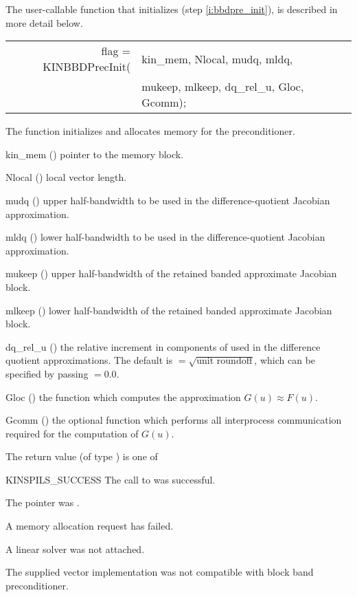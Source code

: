The user-callable function that initializes {\kinbbdpre} (step \ref{i:bbdpre_init}),
is described in more detail below.
{
   \begin{tabular}[t]{@{}r@{}l@{}}
     flag = KINBBDPrecInit(&kin\_mem, Nlocal, mudq, mldq, \\
                           &mukeep, mlkeep, dq\_rel\_u, Gloc, Gcomm);
   \end{tabular}
}
{
  The function  initializes and allocates
  memory for the {\kinbbdpre} preconditioner.
}
{
  \begin{args}[dq\_rel\_u]
  \item[kin\_mem] ()
    pointer to the {\kinsol} memory block.
  \item[Nlocal] ()
    local vector length.
  \item[mudq] ()
    upper half-bandwidth to be used in the difference-quotient Jacobian approximation.
  \item[mldq] ()
    lower half-bandwidth to be used in the difference-quotient Jacobian approximation.
  \item[mukeep] ()
    upper half-bandwidth of the retained banded approximate Jacobian block.
  \item[mlkeep] ()
    lower half-bandwidth of the retained banded approximate Jacobian block.
  \item[dq\_rel\_u] ()
    the relative increment in components of  used in the difference quotient
    approximations.  The default is $ = \sqrt{\text{unit roundoff}}$,
    which can be specified by passing $ = 0.0$.
  \item[Gloc] ()
    the {\C} function which computes the approximation $G(u) \approx F(u)$. 
  \item[Gcomm] ()
    the optional {\C} function which performs all interprocess communication required for
    the computation of $G(u)$.
  \end{args}
}
{
  The return value  (of type ) is one of
  \begin{args}
  \item[KINSPILS\_SUCCESS]
    The call to  was successful.
  \item[\id{KINSPILS\_MEM\_NULL}] 
    The  pointer was .
  \item[\Id{KINSPILS\_MEM\_FAIL}]
    A memory allocation request has failed.
  \item[\Id{KINSPILS\_LMEM\_NULL}]
    A {\kinspils} linear solver was not attached.
  \item[\Id{KINSPILS\_ILL\_INPUT}]
    The supplied vector implementation was not compatible with block band preconditioner.
  \end{args}
}
